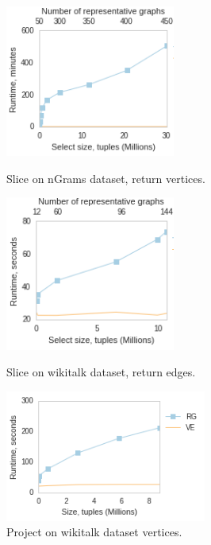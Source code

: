 \begin{figure}
\centering
\begin{minipage}{2.2in}
\centering
\includegraphics[width=2.2in]{figs/slice_ngrams_vertices_build11_trimmed.png}
\vspace{-0.1in}
\caption{Slice on nGrams dataset, return vertices.}
\label{fig:sliceverts}
\vspace{-0.1in}
\end{minipage}
\begin{minipage}{2.2in}
\centering
\includegraphics[width=2.2in]{figs/slice_wikitalk_edges_build11_trimmed.png}
\vspace{-0.1in}
\caption{Slice on wikitalk dataset, return edges.}
\label{fig:sliceedges}
\vspace{-0.1in}
\end{minipage}
\begin{minipage}{2.2in}
\centering
\includegraphics[width=2.6in]{figs/project_wikitalk_vertices_build12.png}
\vspace{-0.1in}
\caption{Project on wikitalk dataset vertices.}
\label{fig:project}
\vspace{-0.1in}
\end{minipage}
\end{figure}

